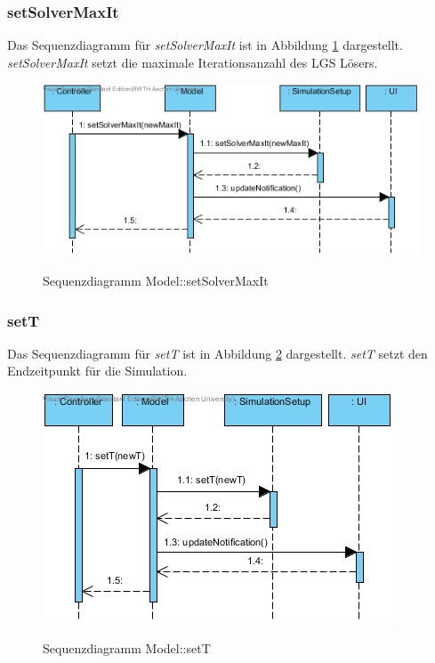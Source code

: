 \subsubsection*{setSolverMaxIt}

Das Sequenzdiagramm für \emph{setSolverMaxIt} ist in Abbildung \ref{Sequenzdiagramm Model::setSolverMaxIt} dargestellt. \emph{setSolverMaxIt} setzt die maximale Iterationsanzahl des LGS Lösers.

\begin{figure}[H]
	\centering
	\includegraphics[scale=.85]{Bilder/Model__setSolverMaxIt().jpg}\\
	\caption{Sequenzdiagramm Model::setSolverMaxIt}
	\label{Sequenzdiagramm Model::setSolverMaxIt}
\end{figure}

\subsubsection*{setT}

Das Sequenzdiagramm für \emph{setT} ist in Abbildung \ref{Sequenzdiagramm Model::setT} dargestellt. \emph{setT} setzt den Endzeitpunkt für die Simulation.

\begin{figure}[H]
	\centering
	\includegraphics[scale=.85]{Bilder/Model__setT().jpg}\\
	\caption{Sequenzdiagramm Model::setT}
	\label{Sequenzdiagramm Model::setT}
\end{figure}

